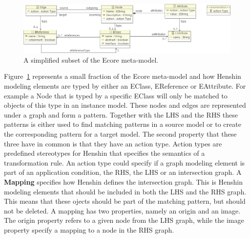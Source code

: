 \begin{figure}[H]
	\centering
	\includegraphics[scale=0.60]{./Figures/Node_edge_attribute.png}
	\caption[Henshin relationship with Ecore]
	{A simplified subset of the Ecore meta-model.}
	\label{fig:henshin_ecore}
\end{figure}

Figure~\ref{fig:henshin_ecore} represents a small fraction of the Ecore
meta-model and how Henshin modeling elements are typed by either an EClass,
EReference or EAttribute. For example a Node that is typed by a specific EClass
will only be matched to objects of this type in an instance model. These nodes
and edges are represented under a graph and form a pattern. Together with the
LHS and the RHS these patterns is either used to find matching patterns in a
source model or to create the corresponding pattern for a target model. The
second property that these three have in common is that they have an action
type. Action types are predefined stereotypes for Henshin that specifies the
semantics of a transformation rule. An action type could specify if a graph
modeling element is part of an application condition, the RHS, the LHS or an
intersection graph. A \textbf{Mapping} specifies how Henshin defines the
intersection graph. This is Henshin modeling elements that should be included
in both the LHS and the RHS graph. This means that these ojects should be part
of the matching pattern, but should not be deleted. A mapping has two
properties, namely an origin and an image. The origin property refers to a
given node from the LHS graph, while the image property specify a mapping to a
node in the RHS graph.

